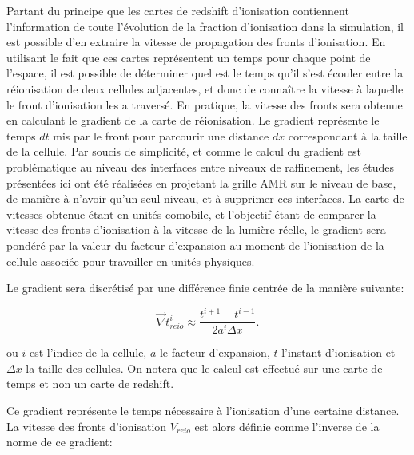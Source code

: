 Partant du principe que les cartes de redshift d'ionisation contiennent l'information de toute l'évolution de la fraction d'ionisation dans la simulation, il est possible d'en extraire la vitesse de propagation des fronts d'ionisation.
En utilisant le fait que ces cartes représentent un temps pour chaque point de l'espace, il est possible de déterminer quel est le temps qu'il s'est écouler entre la réionisation de deux cellules adjacentes, et donc de connaître la vitesse à laquelle le front d'ionisation les a traversé.
En pratique, la vitesse des fronts sera obtenue en calculant le gradient de la carte de réionisation.
Le gradient représente le temps $dt$ mis par le front pour parcourir une distance $dx$ correspondant à la taille de la cellule.
Par soucis de simplicité, et comme le calcul du gradient est problématique au niveau des interfaces entre niveaux de raffinement, les études présentées ici ont été réalisées en projetant la grille \ac{AMR} sur le niveau de base, de manière à n'avoir qu'un seul niveau, et à supprimer ces interfaces.
La carte de vitesses obtenue étant en unités comobile, et l'objectif étant de comparer la vitesse des fronts d'ionisation à la vitesse de la lumière réelle, le gradient sera pondéré par la valeur du facteur d'expansion au moment de l'ionisation de la cellule associée pour travailler en unités physiques.



Le gradient sera discrétisé par une différence finie centrée de la manière suivante:

\begin{equation}
\vec{\nabla} t_{reio}^i \approx \frac{t^{i+1}  - t^{i-1}}{2a^i \Delta x }. %
\end{equation}

ou $i$ est l'indice de la cellule, $a$ le facteur d'expansion, $t$ l'instant d'ionisation et $\Delta x$ la taille des cellules.
On notera que le calcul est effectué sur une carte de temps et non un carte de redshift.

Ce gradient représente le temps nécessaire à l'ionisation d'une certaine distance.
La vitesse des fronts d'ionisation $V_{reio}$ est alors définie comme l'inverse de la norme de ce gradient:

